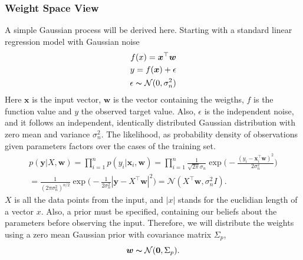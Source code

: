 \subsubsection{Weight Space View}
A simple Gaussian process will be derived here. Starting with a standard linear regression model with Gaussian noise
\begin{subequations}%
	\label{eq:Linear Regression Model}
	\begin{align}
	f(x) = \bm{x}^\top \bm{w}         \label{eq: linear regression function} \\
	y = f(\bm{x}) + \epsilon         \label{eq: observed target value} \\
	\epsilon \thicksim \mathcal{N}(0, \sigma_{n}^{2})
	\end{align}
\end{subequations}
Here $\bm{x}$ is the input vector, $\bm{w}$ is the vector containing the weigths, $f$ is the function value and $y$ the observed target value. Also, $\epsilon$ is the independent noise, and it follows an independent, identically distributed Gaussian distribution with zero mean and variance $\sigma_{n}^{2}$. The likelihood, as probability density of observations given parameters factors over the cases of the training set. 
\begin{subequations}%
	\label{eq:Likelihood Weight Space View}
	\begin{align}
	p(\bm{y}|X,\bm{w}) = \prod_{i=1}^{n} p(y_i|\bm{x}_{i}, \bm{w}) =  \prod_{i=1}^{n} \frac{1}{\sqrt{2\pi}\sigma_{n}} \exp \Big( -\frac{(y_i -\bm{x}_{i}^{\top}\bm{w})^2}{2\sigma^2_n}\Big)      \label{eq:likelihood wieght space 1} \\
	= \frac{1}{(2\pi\sigma_n^2)^{n/2}} \exp \Big( -\frac{1}{2\sigma_n^2 }|\bm{y}-X^{\top}\bm{w}|^2 \Big) = \mathcal{N}(X^{\top}\bm{w}, \sigma_n^2 I)         \label{eq:likelihood weight space 2}.
	\end{align}
\end{subequations}
$X$ is all the data points from the input, and $|x|$ stands for the euclidian length of a vector $x$. Also, a prior must be specified, containing our beliefs about the parameters before observing the input. Therefore, we will distribute the weights using a zero mean Gaussian prior with covariance matrix $\Sigma_p$, 
\begin{equation}%
	\bm{w} \thicksim \mathcal{N}(\bm{0}, \Sigma_p).
\label{Distribution of weights using a zero mean Gaussian with covariance matrix.}
\end{equation}
